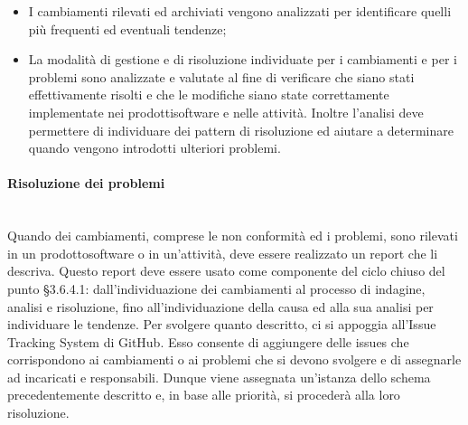 \begin{itemize}
\begin{itemize}
\begin{itemize}
			\item \textbf{Conformità}: cambiamento che comporta violazioni di conformità del prodotto\glosp software;
			\item \textbf{Validazione}: cambiamento riscontrato durante il processo\glosp di Validazione\glosp del prodotto\glosp software.
		\end{itemize}
		\item \textbf{Priorità}: può essere:
		\begin{itemize}
			\item bloccante;
			\item urgente;
			\item alta;
			\item media;
			\item bassa.
		\end{itemize}
		\item \textbf{Stato}: può essere:
		\begin{itemize}
			\item da fare;
			\item in corso;
			\item completato.
		\end{itemize}
	\end{itemize}
	\item I cambiamenti rilevati ed archiviati vengono analizzati per identificare quelli più frequenti ed eventuali tendenze;
	\item La modalità di gestione e di risoluzione individuate per i cambiamenti e per i problemi sono analizzate e valutate al fine di verificare che siano stati effettivamente risolti e che le modifiche siano state correttamente implementate nei prodotti\glosp software e nelle attività. Inoltre l'analisi deve permettere di individuare dei pattern di risoluzione ed aiutare a determinare quando vengono introdotti ulteriori problemi.			
\end{itemize}

\paragraph{Risoluzione dei problemi}\mbox{}\\ [1mm]
Quando dei cambiamenti, comprese le non conformità ed i problemi, sono rilevati in un prodotto\glosp software o in un'attività, deve essere realizzato un report che li descriva. Questo report deve essere usato come componente del ciclo chiuso del punto §3.6.4.1: dall'individuazione dei cambiamenti al processo di indagine, analisi e risoluzione, fino all'individuazione della causa ed alla sua analisi per individuare le tendenze.
Per svolgere quanto descritto, ci si appoggia all'Issue Tracking System di GitHub. Esso consente di aggiungere delle issues che corrispondono ai cambiamenti o ai problemi che si devono svolgere e di assegnarle ad incaricati e responsabili. Dunque viene assegnata un'istanza dello schema precedentemente descritto e, in base alle priorità, si procederà alla loro risoluzione.

